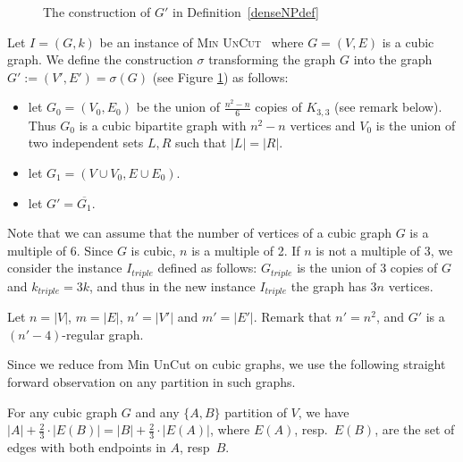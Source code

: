 \documentclass[a4paper,USenglish,cleveref, autoref]{lipics-v2021}
\newcommand\UC{\textsc{Min UnCut}}
\begin{document}
\begin{figure}
\begin{center}
    \caption{The construction of $G'$ in Definition~\ref{denseNPdef}}
    \label{fig:hardDens}
    \end{center}
\end{figure}

\begin{definition}\label{denseNPdef}
Let $I = (G,k)$ be an instance of \UC~ where $G=(V,E)$ is a cubic graph. We define the construction $\sigma$ transforming the graph $G$ into the graph $G':= (V',E') =\sigma(G)$ (see Figure \ref{fig:hardDens}) as follows:
\begin{itemize}
    \item let $G_0=(V_0,E_0)$ be the union of  $\frac{n^2 - n}{6}$ copies of $K_{3,3}$ (see remark below). Thus $G_0$ is a cubic bipartite graph with $n^2 - n$ vertices and $V_0$ is the union of two independent sets $L, R$ such that $|L|=|R|$.
    \item let $G_1 = (V \cup V_0, E \cup E_0)$.
    \item let $G' = \overline{G_1}$.
\end{itemize}
 
\end{definition}

\begin{remark}
Note that  we can assume that the number of vertices of a cubic graph $G$  is a multiple of $6$. Since $G$ is cubic, $n$ is a multiple of 2.
If $n$ is not a multiple of 3, we consider the instance $I_{triple}$ defined as follows: $G_{triple}$ is the union of 3 copies of $G$ and $k_{triple}=3k$, and thus in the new instance $I_{triple}$ the graph has $3n$ vertices. 
\end{remark}

Let $n=|V|$, $m=|E|$,  $n'=|V'|$ and $m'=|E'|$. Remark that $n' = n^2$, and  $G'$ is a $(n'-4)$-regular graph. 

Since we reduce from {Min UnCut} on cubic graphs, we use the following straight forward observation on any partition in such graphs.
\begin{lemma} For any cubic graph $G$ and any $\{A,B\}$   partition of $V$, we have 
$ |A| + \frac{2}{3}\cdot |E(B)| = |B| + \frac{2}{3} \cdot |E(A)|$, 
where $E(A)$, resp.~$E(B)$, are the set of edges with both endpoints in $A$, resp~$B$.
\label{lem:interneexterne}
\end{lemma}
\end{document}
